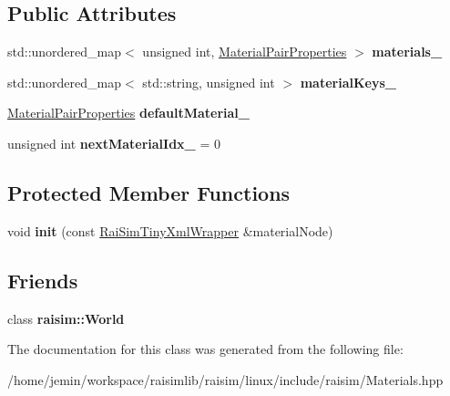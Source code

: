 \subsection*{Public Attributes}
\begin{DoxyCompactItemize}
\item 
\mbox{\label{classraisim_1_1MaterialManager_afaa2e7e1e8f6911fe0a9b0c5435fd019}} 
std\+::unordered\+\_\+map$<$ unsigned int, \hyperlink{structraisim_1_1MaterialPairProperties}{Material\+Pair\+Properties} $>$ {\bfseries materials\+\_\+}
\item 
\mbox{\label{classraisim_1_1MaterialManager_a85f96bba8a7e60688b1d7afffa471742}} 
std\+::unordered\+\_\+map$<$ std\+::string, unsigned int $>$ {\bfseries material\+Keys\+\_\+}
\item 
\mbox{\label{classraisim_1_1MaterialManager_a35a2a8f464c79decfd6bd96b0c0dcb0a}} 
\hyperlink{structraisim_1_1MaterialPairProperties}{Material\+Pair\+Properties} {\bfseries default\+Material\+\_\+}
\item 
\mbox{\label{classraisim_1_1MaterialManager_a002b84cb16184d3efcf618152192c497}} 
unsigned int {\bfseries next\+Material\+Idx\+\_\+} = 0
\end{DoxyCompactItemize}
\subsection*{Protected Member Functions}
\begin{DoxyCompactItemize}
\item 
\mbox{\label{classraisim_1_1MaterialManager_a1150dba5aa4263e5775504493416496d}} 
void {\bfseries init} (const \hyperlink{classraisim_1_1RaiSimTinyXmlWrapper}{Rai\+Sim\+Tiny\+Xml\+Wrapper} \&material\+Node)
\end{DoxyCompactItemize}
\subsection*{Friends}
\begin{DoxyCompactItemize}
\item 
\mbox{\label{classraisim_1_1MaterialManager_a75377ff6a84c306b270e189091d3efed}} 
class {\bfseries raisim\+::\+World}
\end{DoxyCompactItemize}


The documentation for this class was generated from the following file\+:\begin{DoxyCompactItemize}
\item 
/home/jemin/workspace/raisimlib/raisim/linux/include/raisim/Materials.\+hpp\end{DoxyCompactItemize}
